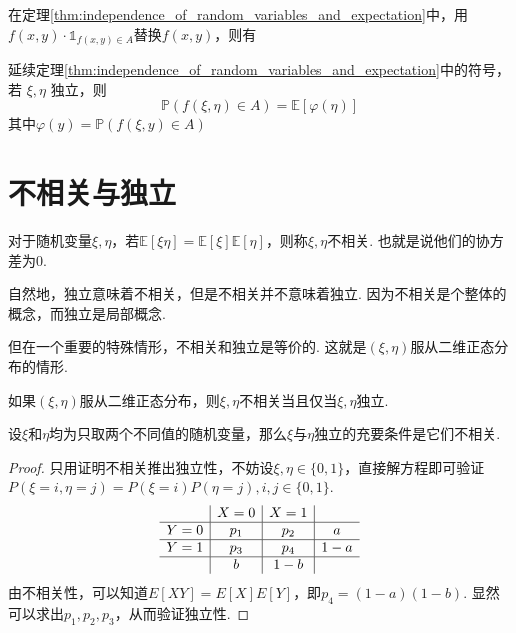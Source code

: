 在定理\ref{thm:independence_of_random_variables_and_expectation}中，用$f(x,y)\cdot \mathbb{1}_{f(x,y)\in A}$替换$f(x,y)$，则有
\begin{corollary}
    延续定理\ref{thm:independence_of_random_variables_and_expectation}中的符号，若 $\xi, \eta$ 独立，则
    \[
        \mathbb{P}(f(\xi,\eta)\in A)=\mathbb{E}[\varphi(\eta)]
    \]
    其中$\varphi(y)=\mathbb{P}(f(\xi,y)\in A)$
\end{corollary}

\section{不相关与独立}

对于随机变量$\xi,\eta$，若$\mathbb{E}[\xi\eta]=\mathbb{E}[\xi]\mathbb{E}[\eta]$，则称$\xi,\eta$不相关. 也就是说他们的协方差为0.

自然地，独立意味着不相关，但是不相关并不意味着独立. 因为不相关是个整体的概念，而独立是局部概念.

\begin{note}
    但在一个重要的特殊情形，不相关和独立是等价的. 这就是$(\xi,\eta)$服从二维正态分布的情形.
\end{note}

\begin{theorem}
    如果$(\xi,\eta)$服从二维正态分布，则$\xi,\eta$不相关当且仅当$\xi,\eta$独立.
\end{theorem}

\begin{theorem}
    设$\xi$和$\eta$均为只取两个不同值的随机变量，那么$\xi$与$\eta$独立的充要条件是它们不相关.
\end{theorem}

\begin{proof}
    只用证明不相关推出独立性，不妨设$\xi,\eta\in\{0,1\}$，直接解方程即可验证$P(\xi=i,\eta=j)=P(\xi=i)P(\eta=j),i,j\in\{0,1\}$.
    \[
        \begin{array}{c|c|c|c}
                & X=0                              & X=1 &     \\
            \hline
            Y=0 & \begin{array}{c} p_1 \end{array} & p_2 & a   \\
            \hline
            Y=1 & p_3                              & p_4 & 1-a \\
            \hline
                & b                                & 1-b &     \\
        \end{array}
    \]
    由不相关性，可以知道$E[XY]=E[X]E[Y]$，即$p_4=(1-a)(1-b)$. 显然可以求出$p_1,p_2,p_3$，从而验证独立性.
\end{proof}

